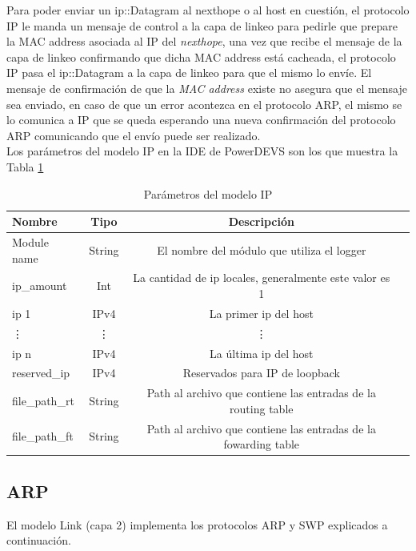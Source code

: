 \documentclass[10pt,a4paper]{article}
\begin{document}
Para poder enviar un ip::Datagram al nexthope o al host en cuestión, el protocolo IP le manda un mensaje de control a la capa de linkeo para pedirle que prepare la MAC address asociada al IP del \textit{nexthope}, una vez que recibe el mensaje de la capa de linkeo confirmando que dicha MAC address está cacheada, el protocolo IP pasa el ip::Datagram a la capa de linkeo para que el mismo lo envíe. El mensaje de confirmación de que la \textit{MAC address} existe no asegura que el mensaje sea enviado, en caso de que un error acontezca en el protocolo ARP, el mismo se lo comunica a IP que se queda esperando una nueva confirmación del protocolo ARP comunicando que el envío puede ser realizado. \\

Los parámetros del modelo IP en la IDE de PowerDEVS son los que muestra la Tabla \ref{table: parameters ip}

\begin{table}[h]
\begin{tabular}{|l|c|c|c|}
  \hline
  \textbf{Nombre} & \textbf{Tipo} & \textbf{Descripción} \\
  \hline
  Module name & String & El nombre del módulo que utiliza el logger \\
  \hline
  ip\_amount & Int & La cantidad de ip locales, generalmente este valor es 1 \\
  \hline
  ip 1 & IPv4 & La primer ip del host \\
  \hline
  \vdots & \vdots & \vdots \\
  \hline
  ip n & IPv4 & La última ip del host \\
  \hline
  reserved\_ip & IPv4 & Reservados para IP de loopback \\
  \hline
  file\_path\_rt & String & Path al archivo que contiene las entradas de la routing table \\
  \hline
  file\_path\_ft & String & Path al archivo que contiene las entradas de la fowarding table \\
  \hline
\end{tabular}
\caption{Parámetros del modelo IP}
\label{table: parameters ip}
\end{table}

\newpage

\subsection{ARP}

El modelo Link (capa 2) implementa los protocolos ARP y SWP explicados a continuación. \\
\end{document}
